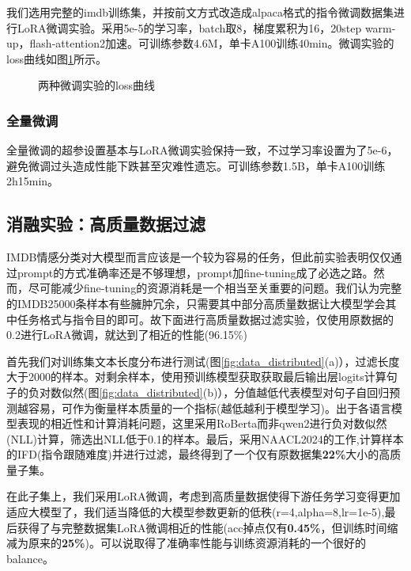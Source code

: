 \documentclass{article}
\begin{document}
我们选用完整的imdb训练集，并按前文方式改造成alpaca格式的指令微调数据集进行LoRA微调实验。采用5e-5的学习率，batch取8，梯度累积为16，20step warm-up，flash-attention2\cite{dao2023flashattention2}加速。可训练参数4.6M，单卡A100训练40min。微调实验的loss曲线如图\ref{fig:tuning_loss}所示。

\begin{figure}[htbp]
  \centering
  \caption{两种微调实验的loss曲线}
  \label{fig:tuning_loss}
\end{figure}

\subsubsection{全量微调}
全量微调的超参设置基本与LoRA微调实验保持一致，不过学习率设置为了5e-6，避免微调过头造成性能下跌甚至灾难性遗忘。可训练参数1.5B，单卡A100训练2h15min。

\subsection{消融实验：高质量数据过滤}
IMDB情感分类对大模型而言应该是一个较为容易的任务，但此前实验表明仅仅通过prompt的方式准确率还是不够理想，prompt加fine-tuning成了必选之路。然而，尽可能减少fine-tuning的资源消耗是一个相当至关重要的问题。我们认为完整的IMDB25000条样本有些臃肿冗余，只需要其中部分高质量数据让大模型学会其中任务格式与指令目的即可。故下面进行高质量数据过滤实验，仅使用原数据的0.2进行LoRA微调，就达到了相近的性能(96.15\%)

首先我们对训练集文本长度分布进行测试(图\ref{fig:data_distributed}(a)），过滤长度大于2000的样本。对剩余样本，使用预训练模型获取获取最后输出层logits计算句子的负对数似然(图\ref{fig:data_distributed}(b)），分值越低代表模型对句子自回归预测越容易，可作为衡量样本质量的一个指标(越低越利于模型学习)。出于各语言模型表现的相近性和计算消耗问题，这里采用RoBerta而非qwen2进行负对数似然(NLL)计算，筛选出NLL低于0.1的样本。最后，采用NAACL2024的工作\cite{li2024quantity},计算样本的IFD(指令跟随难度)并进行过滤，最终得到了一个仅有原数据集\textbf{22\%}大小的高质量子集。

在此子集上，我们采用LoRA微调，考虑到高质量数据使得下游任务学习变得更加适应大模型了，我们适当降低的大模型参数更新的低秩(r=4,alpha=8,lr=1e-5),最后获得了与完整数据集LoRA微调相近的性能(acc掉点仅有\textbf{0.45\%}，但训练时间缩减为原来的\textbf{25\%})。可以说取得了准确率性能与训练资源消耗的一个很好的balance。
\end{document}

